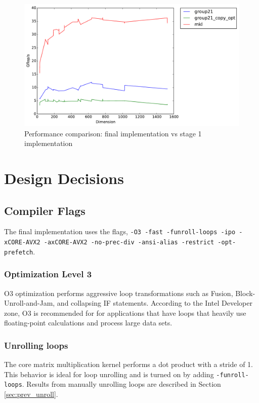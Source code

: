 \documentclass[11pt]{article}
\begin{document}
\begin{figure}[H]
\centering
\includegraphics[scale=0.6]{growth_to_stage1.pdf}
\caption{Performance comparison: final implementation vs stage 1 implementation}
\end{figure}

\section{Design Decisions}
\subsection{Compiler Flags}\label{sec:comp_flags}

The final implementation uses the flags, \texttt{-O3 -fast -funroll-loops -ipo -xCORE-AVX2 -axCORE-AVX2 -no-prec-div -ansi-alias -restrict -opt-prefetch}.
\subsubsection{Optimization Level 3}
O3 optimization performs aggressive loop transformations such as Fusion, Block-Unroll-and-Jam, and collapsing IF statements. According to the Intel Developer zone, \cite{stepbystep} O3 is recommended for for applications that have loops that heavily use floating-point calculations and process large data sets.

\subsubsection{Unrolling loops}
The core matrix multiplication kernel performs a dot product with a stride of 1. This behavior is ideal for loop unrolling and is turned on by adding \texttt{-funroll-loops}. Results from manually unrolling loops are described in Section \ref{sec:prev_unroll}.
\end{document}
